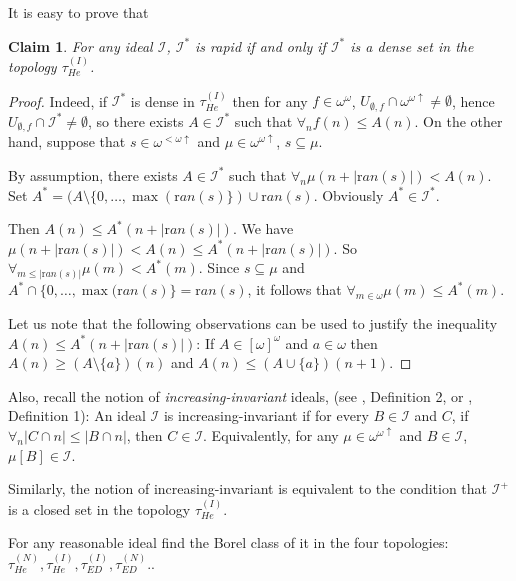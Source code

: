 \documentclass[12pt]{amsart}
\theoremstyle{plain}
\newtheorem{claim}[theorem]{Claim}
\theoremstyle{definition}
\theoremstyle{remark}
\newcommand{\baire}{\omega^{\omega}}
\newcommand{\finincrbaire}{\omega^{< \omega \uparrow}}
\newcommand{\incrbaire}{\omega^{\omega \uparrow}}
\newcommand{\infsub}{[\omega]^{\omega}}
\newcommand{\ran}{{\mathrm ran}}
\newcommand{\calI}{\mathcal{I}}
\newcommand{\cI}{\mathcal{I}}
\newcommand{\Hechler}[2]{U_{#1,#2}}
\newcommand{\HechlerNative}{\tau_{\mathit{He}}^{(N)}}
\newcommand{\HechlerInduced}{\tau_{\mathit{He}}^{(I)}}
\newcommand{\EventuallyDifferentNative}{\tau_{\mathit{ED}}^{(N)}}
\newcommand{\EventuallyDifferentInduced}{\tau_{\mathit{ED}}^{(I)}}
\begin{document}
It is easy to prove that
\begin{claim}
For any ideal $\calI$,
$\calI^*$ is rapid if and only if
$\calI^*$ is a dense set in the topology $\HechlerInduced$.
\end{claim}
\begin{proof}
Indeed, if $\calI^*$ is dense in $\HechlerInduced$ then
for any $f \in \baire$,
$\Hechler{\emptyset}{f} \cap \incrbaire \not= \emptyset$, hence
$\Hechler{\emptyset}{f} \cap \calI^* \not= \emptyset$, so
there exists $A \in \calI^*$ such that $\forall_n f(n) \leq A(n)$.
On the other hand, suppose that $s \in \finincrbaire$
and $\mu \in \incrbaire$, $s \subseteq \mu$.

  By assumption, there exists $A \in \calI^*$ such that
$\forall_{n} \mu(n + |\ran(s)|) < A(n)$.
Set $A^* = (A \setminus \lbrace 0,\ldots,\max(\ran(s)\rbrace) \cup \ran(s)$.
Obviously $A^* \in \calI^*$.

  Then $A(n) \leq A^*(n + |\ran(s)|)$.
We have $ \mu(n + |\ran(s)|) < A(n) \leq  A^*(n + |\ran(s)|)$.
So $\forall_{m \leq |\ran(s)|} \mu(m) < A^*(m)$.
Since $s \subseteq \mu$ and $A^* \cap  \lbrace 0,\ldots,\max(\ran(s)\rbrace = \ran(s)$,
it follows that  $\forall_{m \in \omega} \mu(m) \leq A^*(m)$.

Let us note that the following observations can be used to justify the inequality
$A(n) \leq A^*(n + |\ran(s)|)$:
  If $A \in \infsub$ and $a \in \omega$ then
$A(n) \geq (A\setminus\lbrace a \rbrace)(n)$ and 
$A(n) \leq (A \cup\lbrace a \rbrace)(n + 1)$. 
\end{proof}

Also, recall the notion of {\it increasing-invariant} ideals,
(see \cite{KwelaPoplawskiSwaczynaTryba2019}, Definition 2,
or \cite{Kwela2018}, Definition 1):
An ideal $\cI$ is increasing-invariant if for every $B \in \cI$ and
$C$, if $\forall_n |C \cap n| \leq |B \cap n|$, then $C \in \cI$.
Equivalently, for any $\mu \in \incrbaire$ and $B \in \cI$,
$\mu[B] \in \cI$.

Similarly, the notion of increasing-invariant is equivalent 
to the condition that $\cI^+$ is a closed set in the topology $\HechlerInduced$.

For any reasonable ideal find the Borel class of it in the
four topologies:
$
\HechlerNative, \HechlerInduced, \EventuallyDifferentInduced, \EventuallyDifferentNative.
$.
\end{document}
